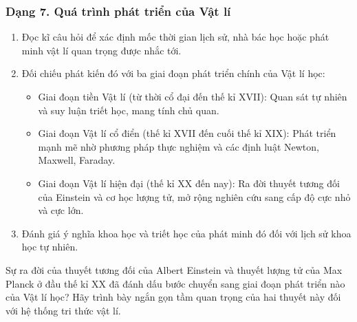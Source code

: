\subsubsection{Dạng 7. Quá trình phát triển của Vật lí}
\begin{phuongphap}
\begin{enumerate}
\item Đọc kĩ câu hỏi để xác định mốc thời gian lịch sử, nhà bác học hoặc phát minh vật lí quan trọng được nhắc tới.
\item Đối chiếu phát kiến đó với ba giai đoạn phát triển chính của Vật lí học:
\begin{itemize}
\item Giai đoạn tiền Vật lí (từ thời cổ đại đến thế kỉ XVII): Quan sát tự nhiên và suy luận triết học, mang tính chủ quan.
\item Giai đoạn Vật lí cổ điển (thế kỉ XVII đến cuối thế kỉ XIX): Phát triển mạnh mẽ nhờ phương pháp thực nghiệm và các định luật Newton, Maxwell, Faraday.
\item Giai đoạn Vật lí hiện đại (thế kỉ XX đến nay): Ra đời thuyết tương đối của Einstein và cơ học lượng tử, mở rộng nghiên cứu sang cấp độ cực nhỏ và cực lớn.
\end{itemize}
\item Đánh giá ý nghĩa khoa học và triết học của phát minh đó đối với lịch sử khoa học tự nhiên.
\end{enumerate}
\end{phuongphap}
\begin{vidumau}
Sự ra đời của thuyết tương đối của Albert Einstein và thuyết lượng tử của Max Planck ở đầu thế kỉ XX đã đánh dấu bước chuyển sang giai đoạn phát triển nào của Vật lí học? Hãy trình bày ngắn gọn tầm quan trọng của hai thuyết này đối với hệ thống tri thức vật lí.
\end{vidumau}